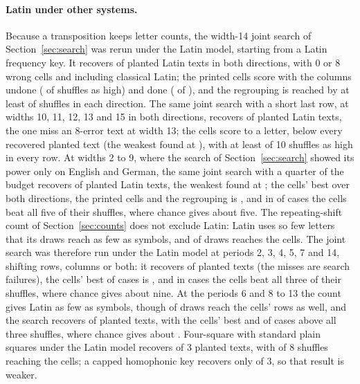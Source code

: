\documentclass[11pt]{article}
\theoremstyle{definition}
\begin{document}
\paragraph{Latin under other systems.} Because a transposition keeps letter counts, the width-14 joint search of Section~\ref{sec:search} was rerun under the Latin model, starting from a Latin frequency key. It recovers \laFourteenRecovered{} of \laFourteenPlanted{} planted Latin texts in both directions, with 0 or 8 wrong cells and including classical Latin; the printed cells score \laFourteenUndone{} with the columns undone (\laFourteenUndoneHigh{} of \laFourteenShuffles{} shuffles as high) and \laFourteenDone{} done (\laFourteenDoneHigh{} of \laFourteenShuffles{}), and the regrouping is reached by at least \laFourteenRegroupedHigh{} of \laFourteenShuffles{} shuffles in each direction. The same joint search with a short last row, at widths 10, 11, 12, 13 and 15 in both directions, recovers \lwRecovered{} of \lwPlanted{} planted Latin texts, the one miss an 8-error text at width 13; the cells score \lwCellsLow{} to \lwCellsHigh{} a letter, below every recovered planted text (the weakest found at \lwWeakestFound{}), with at least \lwAsHighLow{} of 10 shuffles as high in every row. At widths 2 to 9, where the search of Section~\ref{sec:search} showed its power only on English and German, the same joint search with a quarter of the budget recovers \lsmRecovered{} of \lsmPlanted{} planted Latin texts, the weakest found at \lsmWeakestFound{}; the cells' best over both directions, the printed cells and the regrouping is \lsmBest{}, and in \lsmAbove{} of \lsmCases{} cases the cells beat all five of their shuffles, where chance gives about five. The repeating-shift count of Section~\ref{sec:counts} does not exclude Latin: Latin uses so few letters that its draws reach as few as \lmShiftFewest{} symbols, and \lmShiftReaching{} of \lmShiftDraws{} draws reaches the cells. The joint search was therefore run under the Latin model at periods 2, 3, 4, 5, 7 and 14, shifting rows, columns or both: it recovers \lsRecovered{} of \lsPlanted{} planted texts (the misses are search failures), the cells' best of \lsCases{} cases is \lsBest{}, and in \lsAbove{} cases the cells beat all three of their shuffles, where chance gives about nine. At the periods 6 and 8 to 13 the count gives Latin as few as \sgLaFewest{} symbols, though \sgLaReaching{} of \sgLaDraws{} draws reach the cells' rows as well, and the search recovers \sgLaRecovered{} of \sgLaPlanted{} planted texts, with the cells' best \sgLaBest{} and \sgLaAbove{} of \sgLaCases{} cases above all three shuffles, where chance gives about \sgLaChance{}. Four-square with standard plain squares under the Latin model recovers \lmFsRecovered{} of 3 planted texts, with \lmFsCellsHigh{} of 8 shuffles reaching the cells; a capped homophonic key recovers only \lmHomRecovered{} of 3, so that result is weaker.
\end{document}

